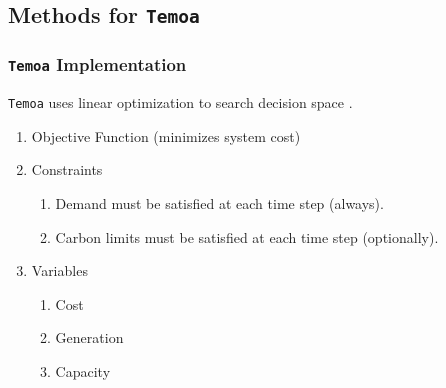 \subsection{Methods for \texttt{Temoa}}
\begin{frame}
  \frametitle{\texttt{Temoa} Implementation}
  \texttt{Temoa} uses linear optimization to search decision space \cite{hunter_modeling_2013}.
  \begin{enumerate}
    \item Objective Function (minimizes system cost)
    \item Constraints
    \begin{enumerate}
      \item Demand must be satisfied at each time step (always).
      \item Carbon limits must be satisfied at each time step (optionally).
    \end{enumerate}
    \item Variables
    \begin{enumerate}
      \item Cost
      \item Generation
      \item Capacity
    \end{enumerate}
  \end{enumerate}
\end{frame}
